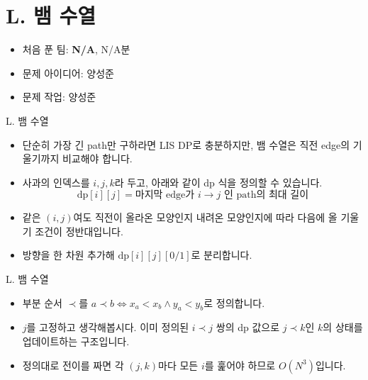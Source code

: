 \def\probno{L}
\def\probtitle{뱀 수열}
\section{\probno{}. \probtitle{}}
\begin{frame}
    \sectiontitle{\probno{}}{\probtitle{}}
    \begin{itemize}
        \item 처음 푼 팀: \textbf{N/A}, N/A분
        \item 문제 아이디어: 양성준
        \item 문제 작업: 양성준
    \end{itemize}
\end{frame}
\begin{frame}{\probno{}. \probtitle{}}
    \begin{itemize}
        \item 단순히 가장 긴 path만 구하라면 LIS DP로 충분하지만, 뱀 수열은 직전 edge의 기울기까지 비교해야 합니다.
        \item 사과의 인덱스를 $i, j, k$라 두고, 아래와 같이 dp 식을 정의할 수 있습니다.
        \[
            \mathrm{dp}[i][j] = \text{마지막 edge가 } i \to j \text{ 인 path의 최대 길이}
        \]
        \item 같은 $(i, j)$여도 직전이 올라온 모양인지 내려온 모양인지에 따라 다음에 올 기울기 조건이 정반대입니다.
        \item 방향을 한 차원 추가해 $\mathrm{dp}[i][j][0/1]$로 분리합니다.
    \end{itemize}
\end{frame}
\begin{frame}{\probno{}. \probtitle{}}
    \begin{itemize}
        \item 부분 순서 $\prec$를 $a \prec b \iff x_a < x_b \land y_a < y_b$로 정의합니다.
        \item $j$를 고정하고 생각해봅시다. 이미 정의된 $i \prec j$ 쌍의 dp 값으로 $j \prec k$인 $k$의 상태를 업데이트하는 구조입니다.
        \item 정의대로 전이를 짜면 각 $(j, k)$마다 모든 $i$를 훑어야 하므로 $O(N^3)$입니다.
    \end{itemize}
\end{frame}
